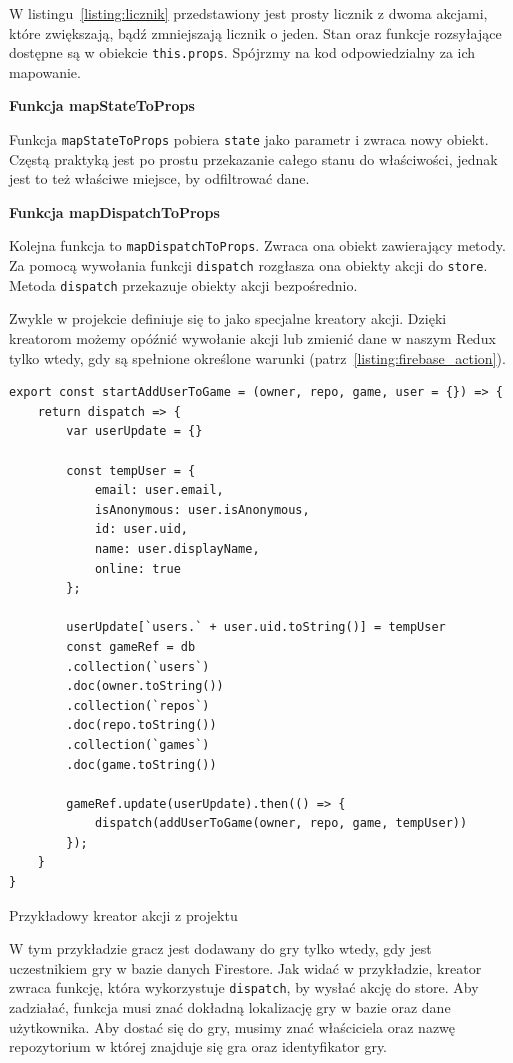 W listingu~\ref{listing:licznik} przedstawiony jest prosty licznik z dwoma akcjami,
które zwiększają, bądź zmniejszają licznik o jeden.
Stan oraz funkcje rozsyłające dostępne są w obiekcie \texttt{this.props}.
Spójrzmy na kod odpowiedzialny za ich mapowanie.
\begin{center}
	\textbf{Funkcja mapStateToProps}
\end{center}
Funkcja \texttt{mapStateToProps} pobiera \texttt{state} jako parametr i zwraca nowy obiekt.
Częstą praktyką jest po prostu przekazanie całego stanu do właściwości,
jednak jest to też właściwe miejsce, by odfiltrować dane.
\begin{center}
	\textbf{Funkcja mapDispatchToProps}
\end{center}
Kolejna funkcja to \texttt{mapDispatchToProps}. Zwraca ona obiekt zawierający metody.
Za pomocą wywołania funkcji \texttt{dispatch} rozgłasza ona obiekty akcji do \texttt{store}.
Metoda \texttt{dispatch} przekazuje obiekty akcji bezpośrednio.

Zwykle w projekcie definiuje się to jako specjalne kreatory akcji.
Dzięki kreatorom możemy opóźnić wywołanie akcji lub zmienić dane w naszym Redux tylko wtedy,
gdy są spełnione określone warunki (patrz~\ref{listing:firebase_action}).

\begin{listing}
\begin{verbatim}
export const startAddUserToGame = (owner, repo, game, user = {}) => {
    return dispatch => {
        var userUpdate = {}

        const tempUser = {
            email: user.email,
            isAnonymous: user.isAnonymous,
            id: user.uid,
            name: user.displayName,
            online: true
        };

        userUpdate[`users.` + user.uid.toString()] = tempUser
        const gameRef = db
        .collection(`users`)
        .doc(owner.toString())
        .collection(`repos`)
        .doc(repo.toString())
        .collection(`games`)
        .doc(game.toString())

        gameRef.update(userUpdate).then(() => {
            dispatch(addUserToGame(owner, repo, game, tempUser))
        });
    }
}
\end{verbatim}
\caption{Przykładowy kreator akcji z projektu} \label{listing:firebase_action}
\end{listing}

W tym przykładzie gracz jest dodawany do gry tylko wtedy,
gdy jest uczestnikiem gry w bazie danych Firestore.
Jak widać w przykładzie, kreator zwraca funkcję,
która wykorzystuje \texttt{dispatch}, by wysłać akcję do store.
Aby zadziałać, funkcja musi znać dokładną lokalizację gry w bazie oraz dane użytkownika.
Aby dostać się do gry, musimy znać właściciela oraz nazwę repozytorium w której znajduje się gra
oraz identyfikator gry.


